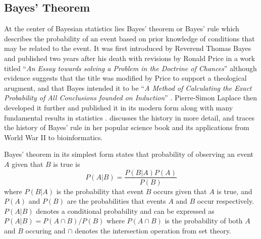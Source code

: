 \subsection{Bayes' Theorem}
At the center of Bayesian statistics lies Bayes' theorem or Bayes' rule which describes the probability of an event based on prior knowledge of conditions that may be related to the event. It was first introduced by Reverend Thomas Bayes and published two years after his death with revisions by Ronald Price in a work titled ``\textit{An Essay towards solving a Problem in the Doctrine of Chances}'' \citep{Bayes1763} although evidence suggests that the title was modified by Price to support a theological arugment, and that Bayes intended it to be ``\textit{A Method of Calculating the Exact Probability of All Conclusions founded on Induction}'' \citep{Stigler13}. Pierre-Simon Laplace then developed it further and published it in its modern form along with many fundamental results in statistics \citep{Laplace1820}. \citet{Dale99} discusses the history in more detail, and \citet{McGrayne11} traces the history of Bayes' rule in her popular science book and its applications from World War II to bioinformatics.

Bayes' theorem in its simplest form states that probability of observing an event $A$ given that $B$ is true is
\begin{equation} \label{eq:BayesRule}
  P(A|B) = \frac{P(B|A) P(A)}{P(B)}
\end{equation}
where $P(B|A)$ is the probability that event $B$ occurs given that $A$ is true, and $P(A)$ and $P(B)$ are the probabilities that events $A$ and $B$ occur respectively. $P(A|B)$ denotes a conditional probability and can be expressed as $P(A|B) = P(A \cap B) / P(B)$ where $P(A \cap B)$ is the probability of both $A$ and $B$ occuring and $\cap$ denotes the intersection operation from set theory.\footnotemark~


